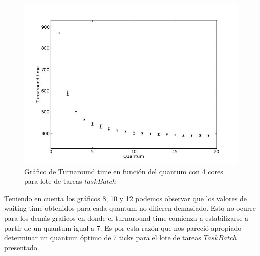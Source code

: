 \begin{figure}[H]
	\begin{center}
		  \includegraphics[scale=0.3]{graficos/cores_4_ta.jpg}
		  \caption{Gráfico de Turnaround time en función del quantum con 4 cores para lote de tareas $taskBatch$}
		  \label{fig:contra1}
	\end{center}
\end{figure}

Teniendo en cuenta los gráficos 8, 10 y 12 podemos observar que los valores de waiting time obtenidos para cada quantum no difieren demasiado. Esto no ocurre para los demás graficos en donde el turnaround time comienza a estabilizarse a partir de un quantum igual a 7. Es por esta razón que nos pareció apropiado determinar un quantum óptimo de 7 ticks para el lote de tareas $TaskBatch$ presentado.

